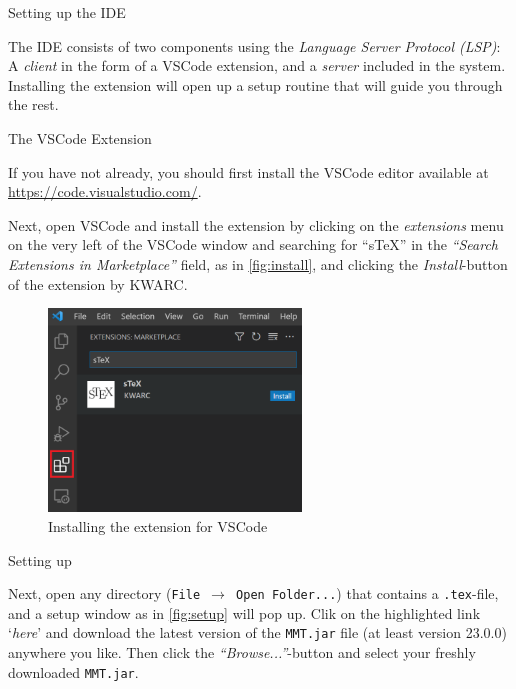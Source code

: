 \begin{sfragment}{Setting up the \sTeX IDE}
  
    The \sTeX IDE consists of two components using the 
    \emph{Language Server Protocol (LSP)}: A \emph{client}
    in the form of a VSCode extension, and a \emph{server}
    included in the \mmt system. Installing the extension will
    open up a setup routine that will guide you through the rest.
  
    \begin{sfragment}{The \sTeX VSCode Extension}
  
      If you have not already, you should first install the VSCode editor 
      available at \url{https://code.visualstudio.com/}.
  
      Next, open VSCode and install the \sTeX extension by clicking on
      the \emph{extensions} menu on the very left of the VSCode window
      and searching for ``sTeX'' in the 
      \emph{``Search Extensions in Marketplace''} field, as in
      \autoref{fig:install}, and clicking the \emph{Install}-button
      of the \sTeX extension by KWARC.
  
      \begin{figure}
        \begin{center}
          \includegraphics[width=0.6\textwidth]{img/vsc1.png}
        \end{center}
        \caption{Installing the \sTeX extension for VSCode}\label{fig:install}
      \end{figure}
  
    \end{sfragment}
  
    \begin{sfragment}{Setting up \mmt}
  
      Next, open any directory (\texttt{File $\to$ Open Folder...}) that contains
      a \verb|.tex|-file, and a setup window as in \autoref{fig:setup} 
      will pop up. Clik on the highlighted link `\emph{here}' and download
      the latest version of the \texttt{MMT.jar} file (at least version 23.0.0)
      anywhere you like. Then click the \emph{``Browse...''}-button
      and select your freshly downloaded \texttt{MMT.jar}.
  

\end{sfragment}
\end{sfragment}

